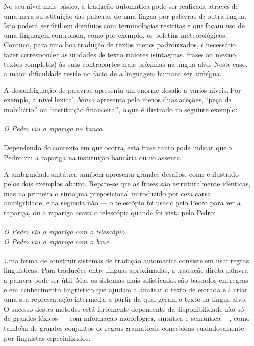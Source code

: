\begin{multicols}{2}
No seu nível mais básico, a tradução automática pode ser realizada através de uma mera substituição das palavras de uma língua por palavras de outra língua. 
Isto poderá ser útil em domínios com terminologias restritas e que façam uso de uma linguagem controlada, como por exemplo, os boletins meteorológicos. 
Contudo, para uma boa tradução de textos menos padronizados, é necessário fazer corresponder as unidades de texto maiores (sintagmas, frases ou mesmo textos completos) às suas contrapartes mais próximas na língua alvo. 
Neste caso, a maior dificuldade reside no facto de a linguagem humana ser ambígua. 

A desambiguação de palavras apresenta um enorme desafio a vários níveis. 
Por exemplo, a nível lexical, \textit{banco} apresenta pelo menos duas aceções, “peça de mobiliário” ou 
“instituição financeira”, o que é ilustrado no seguinte exemplo:\\
\\
\textit{O Pedro viu a rapariga no banco.} \\
\\
Dependendo do contexto em que ocorra, esta frase tanto pode indicar que o Pedro viu a rapariga
na instituição bancária ou no assento.

A ambiguidade sintática também apresenta grandes desafios, como é ilustrado pelos dois exemplos abaixo. 
Repare-se que as frases são estruturalmente idênticas, mas na primeira o sintagma
preposicional introduzido por \textit{com} causa ambiguidade, e na segunda não --- o telescópio
foi usado pelo Pedro para ver a rapariga, ou a rapariga usava o telescópio quando foi vista
pelo Pedro:\\
\\
\textit{O Pedro viu a rapariga com o telescópio.}\\
\textit{O Pedro viu a rapariga com o boné.}\\
\\
Uma forma de construir sistemas de tradução automática consiste em usar regras linguísticas.
Para traduções entre línguas aproximadas, a tradução direta palavra a palavra pode ser útil. 
Mas os sistemas mais sofisticados são baseados em regras e em conhecimento linguístico
que ajudam a analisar o texto de entrada e a criar uma sua representação intermédia a partir da qual geram o texto da língua alvo. 
O sucesso destes métodos está fortemente dependente da disponibilidade não só de grandes lé\-xi\-cos ---
com informação morfológica, sintática e semântica ---, como também de grandes conjuntos de regras gramaticais 
concebidas cuidadosamente por linguistas especializados.


\end{multicols}
